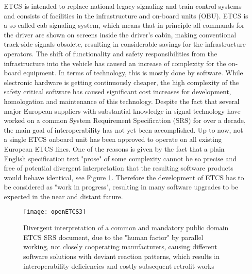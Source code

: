 \documentclass{template/openetcs_report}
\begin{document}
ETCS is intended to replace national legacy signaling and train control systems and consists of facilities in the infrastructure and on-board units (OBU). ETCS is a so called cab-signaling system, which means that in principle all commands for the driver are shown on screens inside the driver's cabin, making conventional track-side signals obsolete, resulting in considerable savings for the infrastructure operators. The shift of functionality and safety responsibilities from the infrastructure into the vehicle has caused an increase of complexity for the on-board equipment. In terms of technology, this is mostly done by software. While electronic hardware is getting continuously cheaper, the high complexity of the safety critical software has caused significant cost increases for development, homologation and maintenance of this technology.
Despite the fact that several major European suppliers with substantial knowledge in signal technology have worked on a common System Requirement Specification (SRS) for over a decade, the main goal of interoperability has not yet been accomplished. Up to now, not a single ETCS onboard unit has been approved to operate on all existing European ETCS lines. One of the reasons is given by the fact that a plain English specification text "prose" of some complexity cannot be so precise and free of potential divergent interpretation that the resulting software products would behave identical, see Figure \ref{fig:openETCS3}. Therefore the development of ETCS has to be considered as "work in progress", resulting in many software upgrades to be expected in the near and distant future.


\begin{figure}[h]
\centering
\texttt{[image: openETCS3]}
\caption{Divergent interpretation of a common and mandatory public domain ETCS SRS document, due to the "human factor" by parallel working, not closely cooperating manufacturers, causing different software solutions with deviant reaction patterns, which results in interoperability deficiencies and costly subsequent retrofit works}
\label{fig:openETCS3}
\end{figure}
\end{document}
